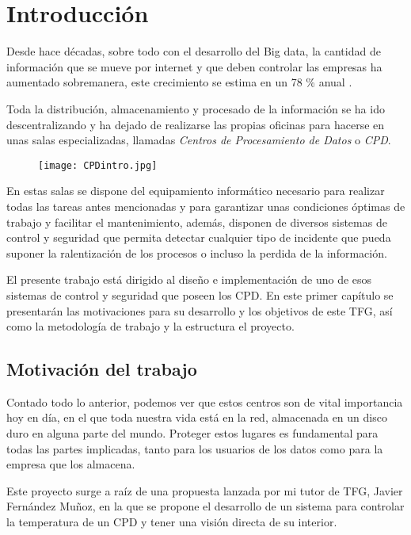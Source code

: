 \chapter{Introducción}
\label{ch:introduccion}
Desde hace décadas, sobre todo con el desarrollo del Big data, la cantidad de información que se mueve por internet y que deben controlar las empresas ha aumentado sobremanera, este crecimiento se estima en un 78 \% anual \cite{monleon-getino_impacto_2015}.

Toda la distribución, almacenamiento y procesado de la información se ha ido descentralizando y ha dejado de realizarse las propias oficinas para hacerse en unas salas especializadas, llamadas \textit{Centros de Procesamiento de Datos} o \textit{CPD}. 
\begin{figure}[H]
	{\texttt{[image: CPDintro.jpg]}}
\end{figure}
En estas salas se dispone del equipamiento informático necesario para realizar todas las tareas antes mencionadas y para garantizar unas condiciones óptimas de trabajo y facilitar el mantenimiento, además, disponen de diversos sistemas de control y seguridad que permita detectar cualquier tipo de incidente que pueda suponer la ralentización de los procesos o incluso la perdida de la información.

El presente trabajo está dirigido al diseño e implementación de uno de esos sistemas de control y seguridad que poseen los CPD. En este primer capítulo se presentarán las motivaciones para su desarrollo y los objetivos de este TFG, así como la metodología de trabajo y la estructura el proyecto.

\section{Motivación del trabajo}
Contado todo lo anterior, podemos ver que estos centros son de vital importancia hoy en día, en el que toda nuestra vida está en la red, almacenada en un disco duro en alguna parte del mundo. Proteger estos lugares es fundamental para todas las partes implicadas, tanto para los usuarios de los datos como para la empresa que los almacena.

Este proyecto surge a raíz de una propuesta lanzada por mi tutor de TFG, Javier Fernández Muñoz, en la que se propone el desarrollo de un sistema para controlar la temperatura de un CPD y tener una visión directa de su interior. 

